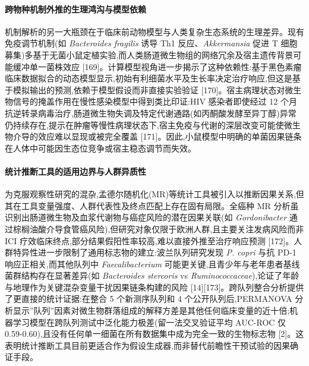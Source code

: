 \documentclass[11pt]{article}
\begin{document}
\paragraph{跨物种机制外推的生理鸿沟与模型依赖}\label{ux8de8ux7269ux79cdux673aux5236ux5916ux63a8ux7684ux751fux7406ux9e3fux6c9fux4e0eux6a21ux578bux4f9dux8d56}

机制解析的另一大瓶颈在于临床前动物模型与人类复杂生态系统的生理差异。现有免疫调节机制(如 \emph{Bacteroides fragilis} 诱导 Th1 反应、\emph{Akkermansia} 促进 T 细胞募集)多基于无菌小鼠定植实验,而人类肠道微生物组的网络冗余及宿主遗传背景可能缓冲单一菌株效应 {[}169{]}。计算模型视角进一步揭示了这种依赖性:基于黑色素瘤临床数据拟合的动态模型显示,初始有利细菌水平及生长率决定治疗响应,但这是基于模拟输出的预测,依赖于模型假设而非直接实验验证 {[}170{]}。宿主病理状态对微生物信号的掩盖作用在慢性感染模型中得到类比印证:HIV 感染者即使经过 12 个月抗逆转录病毒治疗,肠道微生物失调及特定代谢通路(如丙酮酸发酵至异丁醇)异常仍持续存在,提示在肿瘤等慢性病理状态下,宿主免疫与代谢的深层改变可能使微生物介导的效应难以显现或被完全覆盖 {[}171{]}。因此,小鼠模型中明确的单菌因果链条在人体中可能因生态位竞争或宿主稳态调节而失效。

\paragraph{统计推断工具的适用边界与人群异质性}\label{ux7edfux8ba1ux63a8ux65adux5de5ux5177ux7684ux9002ux7528ux8fb9ux754cux4e0eux4ebaux7fa4ux5f02ux8d28ux6027}

为克服观察性研究的混杂,孟德尔随机化(MR)等统计工具被引入以推断因果关系,但其在工具变量强度、人群代表性及终点匹配上存在固有局限。全癌种 MR 分析虽识别出肠道微生物及血浆代谢物与癌症风险的潜在因果关联(如 \emph{Gordonibacter} 通过棕榈油酸介导食管癌风险),但研究对象仅限于欧洲人群,且主要关注发病风险而非 ICI 疗效临床终点,部分结果假阳性率较高,难以直接外推至治疗响应预测 {[}172{]}。人群特异性进一步限制了通用标志物的建立:波兰队列研究发现 \emph{P. copri} 与抗 PD-1 响应正相关,而其他队列中 \emph{Faecalibacterium} 可能更关键,且青少年与老年患者基线菌群结构存在显著差异(如 \emph{Bacteroides stercoris} vs \emph{Ruminococcaceae}),论证了年龄与地理作为关键混杂变量干扰因果链条构建的风险 {[}14{]}{[}173{]}。跨队列整合分析提供了更直接的统计证据:在整合 5 个新测序队列和 4 个公开队列后,PERMANOVA 分析显示''队列''因素对微生物群落组成的解释方差是其他任何临床变量的近十倍;机器学习模型在跨队列测试中泛化能力极差(留一法交叉验证平均 AUC-ROC 仅 0.59-0.60),且没有任何单一细菌在所有数据集中成为完全一致的生物标志物 {[}2{]}。这表明统计推断工具目前更适合作为假设生成器,而非替代前瞻性干预试验的因果确证手段。
\end{document}
